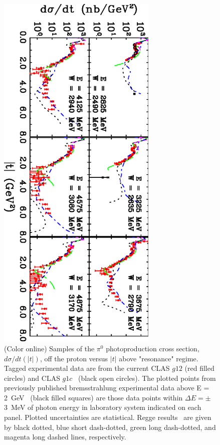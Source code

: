 \documentclass[aps,prc,twocolumn,floatfix,showpacs,preprintnumbers,amsmath,amssymb,superscriptaddress]{revtex4-1}
\begin{document}
\begin{figure}[htb!]
\centerline{
        \includegraphics[width=3in, angle=90]{dsdt.eps}}

        \caption {(Color online) Samples of the $\pi^0$ 
		photoproduction cross section, $d\sigma/dt(|t|)$, 
		off the proton versus $|t|$ above "resonance" 
		regime.  Tagged experimental data are from the 
		current CLAS $g12$ (red filled circles) and CLAS 
		$g1c$~\protect\cite{du07} (black open circles). 
		The plotted points from previously published 
		bremsstrahlung experimental data above E = 
		2~GeV~\protect\cite{brem} (black filled squares) 
		are those data points within $\Delta E = \pm$3~MeV 
		of photon energy in laboratory system indicated on 
		each panel. Plotted uncertainties are statistical.  
		Regge results~\protect\cite{Goldstein,Laget,
		Mathieu,Donnachie} are given by black dotted, 
		blue short dash-dotted, green long dash-dotted, 
		and magenta long dashed lines, respectively.} 
		\label{fig:t_data}
\end{figure}
\end{document}
